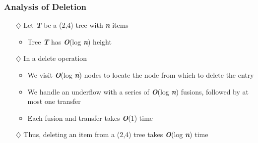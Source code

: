 \documentclass[pdf,
serif,
compress,
xcolor=table,
dvipsnames,
spanish,
aspectratio=169]{beamer}
\begin{document}
\begin{frame}
\begin{minipage}{0.45\linewidth}
    \end{minipage}
\end{frame}

\begin{frame}
    \frametitle{Analysis of Deletion}
    \begin{itemize} \color{purpura}
        \item[\(\diamondsuit\)] Let \textbf{\textit{T}} be a (2,4) tree with \textbf{\textit{n}} items
        \begin{itemize} \color{purpura}
            \item Tree \textbf{\textit{T}} has \textbf{\textit{O}}(log \textbf{\textit{n}}) height
        \end{itemize}
        
        \item[\(\diamondsuit\)] In a delete operation
        \begin{itemize} \color{purpura}
            \item We visit \textbf{\textit{O}}(log \textbf{\textit{n}}) nodes to locate the node from which to delete the entry
            \item We handle an underflow with a series of \textbf{\textit{O}}(log \textbf{\textit{n}}) fusions, followed by at most one transfer
            \item Each fusion and transfer takes \textbf{\textit{O}}(1) time
        \end{itemize}

        \item[\(\diamondsuit\)] Thus, deleting an item from a (2,4) tree takes \textbf{\textit{O}}(log \textbf{\textit{n}}) time
    \end{itemize}
\end{frame}
\end{document}
